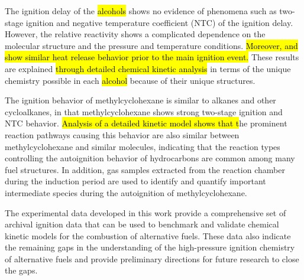 The ignition delay of the \hl{alcohols} shows no evidence of phenomena such
as two-stage ignition and negative temperature coefficient (NTC) of the
ignition delay. However, the relative reactivity shows a complicated
dependence on the molecular structure and the pressure and temperature
conditions. \hl{Moreover, \iPeOH{} and \tBuOH{} show similar heat
release behavior prior to the main ignition event.} These results are
explained \hl{through detailed chemical kinetic analysis} in terms of the
unique chemistry possible in each \hl{alcohol} because
of their unique structures.

The ignition behavior of methylcyclohexane is similar to alkanes
and other cycloalkanes, in that methylcyclohexane shows strong two-stage
ignition and NTC behavior. \hl{Analysis of a detailed kinetic model shows
that t}he prominent reaction pathways causing this behavior are also
similar between methylcyclohexane and similar molecules, indicating that
the reaction types controlling the autoignition behavior of hydrocarbons
are common among many fuel structures. In addition, gas samples extracted
from the reaction chamber during the induction period are used to identify
and quantify important intermediate species during the autoignition of
methylcyclohexane.

The experimental data developed in this work provide a comprehensive set
of archival ignition data that can be used to benchmark and validate
chemical kinetic models for the combustion of alternative fuels. These
data also indicate the remaining gaps in the understanding of the
high-pressure ignition chemistry of alternative fuels and provide preliminary
directions for future research to close the gaps.
% 
